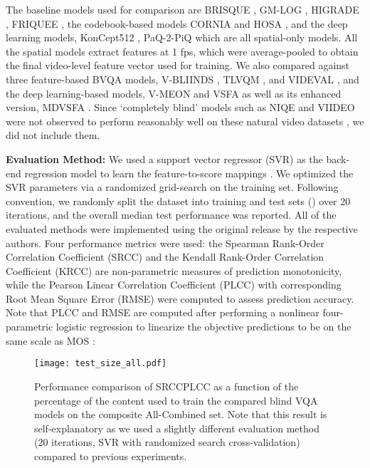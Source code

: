 \documentclass[transmag]{IEEEtran}
\begin{document}
The baseline models used for comparison are BRISQUE \cite{mittal2012no}, GM-LOG \cite{xue2014blind}, HIGRADE \cite{kundu2017no}, FRIQUEE \cite{ghadiyaram2017perceptual}, the codebook-based models CORNIA \cite{ye2012unsupervised} and HOSA \cite{xu2016blind}, and the deep learning models, KonCept512 \cite{hosu2020koniq}, PaQ-2-PiQ \cite{ying2019patches} which are all spatial-only models. All the spatial models extract features at 1 fps, which were average-pooled to obtain the final video-level feature vector used for training. We also compared against three feature-based BVQA models, V-BLIINDS \cite{saad2014blind}, TLVQM \cite{korhonen2019two}, and VIDEVAL \cite{tu2020ugc}, and the deep learning-based models, V-MEON \cite{liu2018end} and VSFA \cite{li2019quality} as well as its enhanced version, MDVSFA \cite{li2020unified}. Since `completely blind' models such as NIQE \cite{mittal2012making} and VIIDEO \cite{mittal2015completely} were not observed to perform reasonably well on these natural video datasets \cite{tu2020ugc}, we did not include them.

\textbf{Evaluation Method:} We used a support vector regressor (SVR) as the back-end regression model to learn the feature-to-score mappings \cite{korhonen2019two, saad2014blind, kim2017deep, ghadiyaram2017perceptual, mittal2012no}. We optimized the SVR parameters  via a randomized grid-search on the training set. Following convention, we randomly split the dataset into training and test sets () over 20 iterations, and the overall median test performance was reported. All of the evaluated methods were implemented using the original release by the respective authors. Four performance metrics were used: the Spearman Rank-Order Correlation Coefficient (SRCC) and the Kendall Rank-Order Correlation Coefficient (KRCC) are non-parametric measures of prediction monotonicity, while the Pearson Linear Correlation Coefficient (PLCC) with corresponding Root Mean Square Error (RMSE) were computed to assess prediction accuracy. Note that PLCC and RMSE are computed after performing a nonlinear four-parametric logistic regression to linearize the objective predictions to be on the same scale as MOS \cite{seshadrinathan2010study}:


\begin{figure}[!t]
\centering
\texttt{[image: test\_size\_all.pdf]}
\caption{Performance comparison of SRCCPLCC as a function of the percentage of the content used to train the compared blind VQA models on the composite All-Combined set. Note that this result is self-explanatory as we used a slightly different evaluation method (20 iterations, SVR with randomized search cross-validation) compared to previous experiments.}
\label{fig:test_size}
\end{figure}
\end{document}
